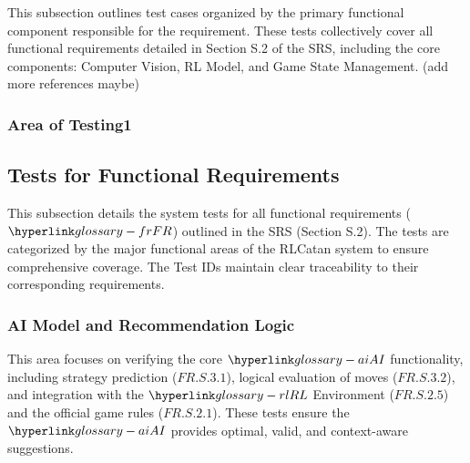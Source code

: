 \documentclass[12pt, titlepage]{article}
\begin{document}



This subsection outlines test cases organized by the primary functional component responsible for the requirement.
These tests collectively cover all functional requirements detailed in Section S.2 of the SRS, including the core components: Computer Vision, RL Model, and Game State Management.
(add more references maybe)



\subsubsection{Area of Testing1}



\subsection{Tests for Functional Requirements}


This subsection details the system tests for all functional requirements ($\FR{}$) outlined in the SRS (Section S.2).
The tests are categorized by the major functional areas of the RLCatan system to ensure comprehensive coverage.
The Test IDs maintain clear traceability to their corresponding requirements.


\subsubsection{AI Model and Recommendation Logic}

This area focuses on verifying the core $\AI{}$ functionality, including strategy prediction ($\hyperref[FR.S.3.1]{FR.S.3.1}$), logical evaluation of moves ($\hyperref[FR.S.3.2]{FR.S.3.2}$), and integration with the $\RL{}$ Environment ($\hyperref[FR.S.2.5]{FR.S.2.5}$) and the official game rules ($\hyperref[FR.S.2.1]{FR.S.2.1}$).
These tests ensure the $\AI{}$ provides optimal, valid, and context-aware suggestions.
\end{document}
